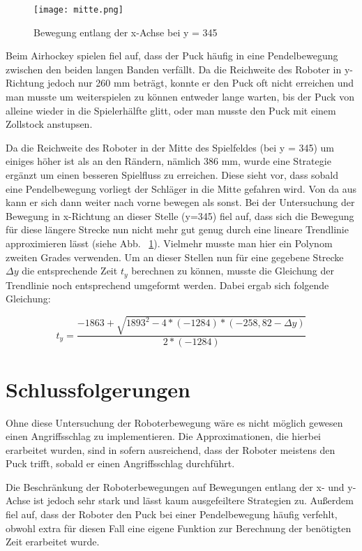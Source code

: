 \begin{figure}[htbp]
\centering
\texttt{[image: mitte.png]}
\caption{Bewegung entlang der x-Achse bei y = 345} 
\label{mitte}
\end{figure}
  
Beim Airhockey spielen fiel auf, dass der Puck häufig in eine Pendelbewegung zwischen den beiden langen Banden verfällt. Da die Reichweite des Roboter in y-Richtung jedoch nur 260 mm beträgt, konnte er den Puck oft nicht erreichen und man musste um weiterspielen zu können entweder lange warten, bis der Puck von alleine wieder in die Spielerhälfte glitt, oder man musste den Puck mit einem Zollstock anstupsen. 

Da die Reichweite des Roboter in der Mitte des Spielfeldes (bei y = 345) um einiges höher ist als an den Rändern, nämlich 386 mm, wurde eine Strategie ergänzt um einen besseren Spielfluss zu erreichen. Diese sieht vor, dass sobald eine Pendelbewegung vorliegt der Schläger in die Mitte gefahren wird. Von da aus kann er sich dann weiter nach vorne bewegen als sonst. 
Bei der Untersuchung der Bewegung in x-Richtung an dieser Stelle (y=345) fiel auf, dass sich die Bewegung für diese längere Strecke nun nicht mehr gut genug durch eine lineare Trendlinie approximieren lässt (siehe Abb. ~\ref{mitte}). Vielmehr musste man hier ein Polynom zweiten Grades verwenden. Um an dieser Stellen nun für eine gegebene Strecke $ \Delta y $ die entsprechende Zeit $ t_y $ berechnen zu können, musste die Gleichung der Trendlinie noch entsprechend umgeformt werden. Dabei ergab sich folgende Gleichung:

\begin{equation}
t_y = \dfrac{-1863+\sqrt{1893^2-4*(-1284)*(-258,82-\Delta y)}}{2*(-1284)}
\end{equation} 

\section{Schlussfolgerungen}
\label{fazitbewegung}
Ohne diese Untersuchung der Roboterbewegung wäre es nicht möglich gewesen einen Angriffsschlag zu implementieren. Die Approximationen, die hierbei erarbeitet wurden, sind in sofern ausreichend, dass der Roboter meistens den Puck trifft, sobald er einen Angriffsschlag durchführt. 

Die Beschränkung der Roboterbewegungen auf Bewegungen entlang der x- und y-Achse ist jedoch sehr stark und lässt kaum ausgefeiltere Strategien zu. Außerdem fiel auf, dass der Roboter den Puck bei einer Pendelbewegung häufig verfehlt, obwohl extra für diesen Fall eine eigene Funktion zur Berechnung der benötigten Zeit erarbeitet wurde. 

